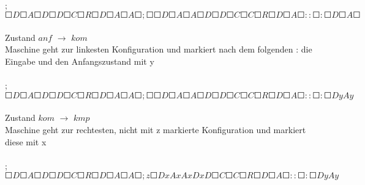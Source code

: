 \documentclass[10pt, a4paper]{article}
\begin{document}
\paragraph{}
\begin{small}
;$\Square D\Square A\Square D\Square D\Square C\Square R\Square D\Square A\Square A\Square ;\Square \Square D\Square A\Square A\Square D\Square D\Square C\Square C\Square R\Square D\Square A\Square ::\Square : \Square D \Square A \Square$\\
\end{small}\par

\paragraph{}
Zustand $anf$ $\rightarrow$ $kom$\\
Maschine geht zur linkesten Konfiguration und markiert nach dem folgenden : die Eingabe und den Anfangszustand mit y\\
\begin{small}
\par
\paragraph{}
;$\Square D \Square  A \Square  D \Square  D \Square  C \Square  R \Square  D \Square  A \Square  A \Square  ;\Square \Square D\Square A\Square A\Square D\Square D\Square C\Square C\Square R \Square D\Square A\Square ::\Square : \Square D y A y $
\end{small}\par

\paragraph{}
Zustand $kom$ $\rightarrow$ $kmp$\\
Maschine geht zur rechtesten, nicht mit z markierte Konfiguration und markiert diese mit x\\
\begin{small}
\par
\paragraph{}
;$\Square D \Square  A \Square  D \Square  D \Square  C \Square  R \Square  D \Square  A \Square  A \Square  ; z  \Square D x  A x  A x  D x  D \Square  C \Square  C \Square  R \Square  D \Square  A  \Square  ::\Square : \Square D y A y$
\end{small}\par
\end{document}
